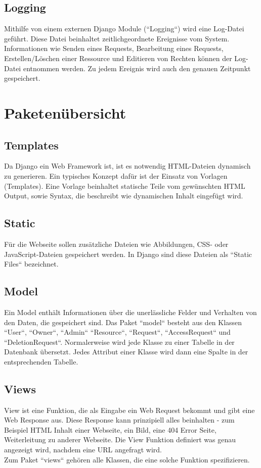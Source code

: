 \documentclass[parskip=full,11pt]{scrartcl}
\begin{document}
 \subsection{Logging}
 Mithilfe von einem externen Django Module (``Logging``) wird eine Log-Datei geführt. Diese Datei beinhaltet zeitlichgeordnete Ereignisse vom System. Informationen wie Senden eines Requests, Bearbeitung eines Requests, Erstellen/Löschen einer Ressource und Editieren von Rechten können der Log-Datei entnommen werden. Zu jedem Ereignis wird auch den genauen Zeitpunkt gespeichert.
 
 
 \section{Paketenübersicht}
 \subsection{Templates}
Da Django ein Web Framework ist, ist es notwendig HTML-Dateien dynamisch zu generieren. Ein typisches Konzept dafür ist der Einsatz von Vorlagen (Templates). Eine Vorlage beinhaltet statische Teile vom gewünschten HTML Output, sowie Syntax, die beschreibt wie dynamischen Inhalt eingefügt wird.
 \subsection{Static}
 Für die Webseite sollen zusätzliche Dateien wie Abbildungen, CSS- oder JavaScript-Dateien gespeichert werden. In Django sind diese Dateien als ``Static Files`` bezeichnet.
 \subsection{Model}
Ein Model enthält Informationen über die unerlässliche Felder und Verhalten von den Daten, die gespeichert sind.
Das Paket ``model`` besteht aus den Klassen ``User``, ``Owner``, ``Admin`` ``Resource``, ``Request``, ``AccessRequest`` und ``DeletionRequest``. Normalerweise wird jede Klasse zu einer Tabelle in der Datenbank übersetzt. Jedes Attribut einer Klasse wird dann eine Spalte in der entsprechenden Tabelle.
 \subsection{Views}
 View ist eine Funktion, die als Eingabe ein Web Request bekommt und gibt  eine Web Response aus. Diese Response kann prinzipiell alles beinhalten - zum Beispiel HTML Inhalt einer Webseite, ein Bild, eine 404 Error Seite, Weiterleitung zu anderer Webseite. Die View Funktion definiert was genau angezeigt wird, nachdem eine URL angefragt wird.\\
 Zum Paket ``views`` gehören alle Klassen, die eine solche Funktion spezifizieren.
\end{document}
